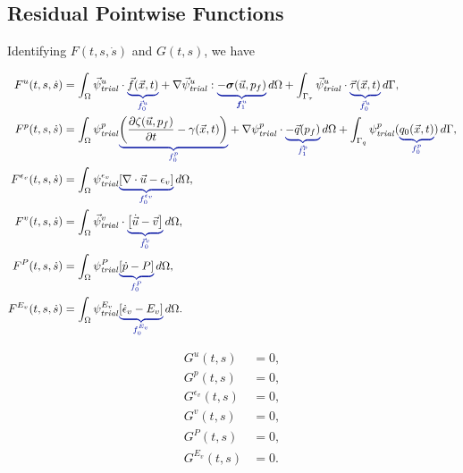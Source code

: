 \subsection{Residual Pointwise Functions}

Identifying $F(t,s,\dot{s})$ and $G(t,s)$, we have

\begin{align}
    F^u(t,s,\dot{s})              & = \int_\Omega \trialvec[u] \cdot \eqnannotate{\vec{f}(\vec{x},t)}{\vec{f}^u_0}
    + \nabla \trialvec[u] : \eqnannotate{-\tensor{\sigma}(\vec{u},p_f)}{\tensor{f}^u_1} \, d\Omega
    + \int_{\Gamma_\tau} \trialvec[u] \cdot \eqnannotate{\vec{\tau}(\vec{x},t)}{\vec{f}^u_0} \, d\Gamma,                                                                             \\
    F^p(t,s,\dot{s})              & = \int_\Omega  \trialscalar[p] \eqnannotate{\left(\frac{\partial \zeta(\vec{u},p_f)}{\partial t} - \gamma(\vec{x},t)\right)} {f^p_0}
    + \nabla \trialscalar[p] \cdot \eqnannotate{-\vec{q}(p_f)}{\vec{f}^p_1} \, d\Omega
    + \int_{\Gamma_q} \trialscalar[p] (\eqnannotate{q_0(\vec{x},t)}{f^p_0}) \, d\Gamma,                                                                                              \\
    F^{\epsilon_{v}}(t,s,\dot{s}) & = \int_{\Omega} \trialscalar[\epsilon_{v}] \eqnannotate{ \left[\nabla \cdot \vec{u} - \epsilon_{v} \right] }{ f^{\epsilon_{v}}_{0} } \, d\Omega, \\
    F^v(t,s,\dot{s})              & = \int_{\Omega} \trialvec[v] \cdot \eqnannotate{ \left[ \dot{\vec{u}} - \vec{v} \right] }{ \vec{f}^{v}_{0} } \, d\Omega,                         \\
    F^{P}(t,s,\dot{s})            & = \int_{\Omega} \trialscalar[P] \eqnannotate{\left[ \dot{p} - P \right]}{ f^{ P }_{0} } \, d\Omega,                                              \\
    F^{E_{v}}(t,s,\dot{s})        & = \int_{\Omega} \trialscalar[E_{v}] \eqnannotate{\left[ \dot{\epsilon}_{v} - E_{v} \right]}{f^{E_{v}}_{0}} \, d\Omega.                           \\
\end{align}

\begin{align}
    G^u(t,s)            & = 0, \\
    G^p(t,s)            & = 0, \\
    G^{\epsilon_v}(t,s) & = 0, \\
    G^{v}(t,s)          & = 0, \\
    G^{P}(t,s)          & =0,  \\
    G^{E_{v}}(t,s)      & =0.
\end{align}

